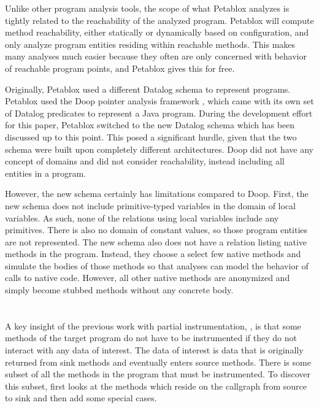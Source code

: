 Unlike other program analysis tools, the scope of what Petablox
analyzes is tightly related to the reachability of the analyzed
program. Petablox will compute method reachability, either statically
or dynamically based on configuration, and only analyze program
entities residing within reachable methods. This makes many analyses
much easier because they often are only concerned with behavior of
reachable program points, and Petablox gives this for free.

Originally, Petablox used a different Datalog schema to represent
programs. Petablox used the Doop pointer analysis framework
\cite{doop}, which came with its own set of Datalog predicates to
represent a Java program. During the development effort for this
paper, Petablox switched to the new Datalog schema which has been
discussed up to this point. This posed a significant hurdle, given
that the two schema were built upon completely different
architectures. Doop did not have any concept of domains and did not
consider reachability, instead including all entities in a program.

However, the new schema certainly has limitations compared to
Doop. First, the new schema does not include primitive-typed variables
in the domain of local variables. As such, none of the relations using
local variables include any primitives. There is also no domain of
constant values, so those program entities are not represented. The
new schema also does not have a relation listing native methods in the
program. Instead, they choose a select few native methods and simulate
the bodies of those methods so that analyses can model the behavior of
calls to native code. However, all other native methods are anonymized
and simply become stubbed methods without any concrete body.

\section{\phosphorpi{}}
A key insight of the previous work with partial instrumentation,
\phosphorpi{} \cite{manoj_project}, is that some methods of the target
program do not have to be instrumented if they do not interact with
any data of interest. The data of interest is data that is originally
returned from sink methods and eventually enters source methods. There
is some subset of all the methods in the program that must be
instrumented. To discover this subset, \phosphorpi{} first looks at
the methods which reside on the callgraph from source to sink and then
add some special cases.


